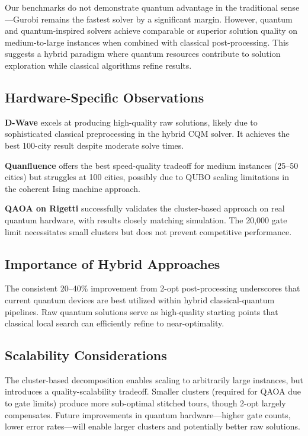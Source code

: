 \documentclass[conference]{IEEEtran}
\begin{document}
Our benchmarks do not demonstrate quantum advantage in the traditional sense---Gurobi remains the fastest solver by a significant margin. However, quantum and quantum-inspired solvers achieve comparable or superior solution quality on medium-to-large instances when combined with classical post-processing. This suggests a hybrid paradigm where quantum resources contribute to solution exploration while classical algorithms refine results.

\subsection{Hardware-Specific Observations}

\textbf{D-Wave} excels at producing high-quality raw solutions, likely due to sophisticated classical preprocessing in the hybrid CQM solver. It achieves the best 100-city result despite moderate solve times.

\textbf{Quanfluence} offers the best speed-quality tradeoff for medium instances (25--50 cities) but struggles at 100 cities, possibly due to QUBO scaling limitations in the coherent Ising machine approach.

\textbf{QAOA on Rigetti} successfully validates the cluster-based approach on real quantum hardware, with results closely matching simulation. The 20,000 gate limit necessitates small clusters but does not prevent competitive performance.

\subsection{Importance of Hybrid Approaches}

The consistent 20--40\% improvement from 2-opt post-processing underscores that current quantum devices are best utilized within hybrid classical-quantum pipelines. Raw quantum solutions serve as high-quality starting points that classical local search can efficiently refine to near-optimality.

\subsection{Scalability Considerations}

The cluster-based decomposition enables scaling to arbitrarily large instances, but introduces a quality-scalability tradeoff. Smaller clusters (required for QAOA due to gate limits) produce more sub-optimal stitched tours, though 2-opt largely compensates. Future improvements in quantum hardware---higher gate counts, lower error rates---will enable larger clusters and potentially better raw solutions.
\end{document}
